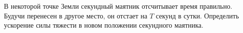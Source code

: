 В некоторой точке Земли секундный маятник отсчитывает время правильно.
Будучи перенесен в другое место, он отстает на $T$ секунд в сутки.
Определить ускорение силы тяжести в новом положении секундного маятника.

